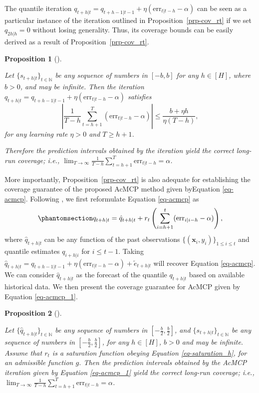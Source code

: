 \documentclass[
  11pt,
  12pt]{article}
\theoremstyle{plain}
\newtheorem{proposition}{Proposition}[section]
\theoremstyle{remark}
\begin{document}
The quantile iteration
\(q_{t+h|t}=q_{t+h-1|t-1}+\eta (\mathrm{err}_{t|t-h}-\alpha)\) can be
seen as a particular instance of the iteration outlined in
Proposition~\ref{prp-cov_rt} if we set \(q_{2h|h}=0\) without losing
generality. Thus, its coverage bounds can be easily derived as a result
of Proposition~\ref{prp-cov_rt}.

\begin{proposition}[]\protect\hypertarget{prp-cov_qt}{}\label{prp-cov_qt}

Let \(\{s_{t+h|t}\}_{t\in\mathbb{N}}\) be any sequence of numbers in
\([-b, b]\) for any \(h\in[H]\), where \(b>0\), and may be infinite.
Then the iteration
\(q_{t+h|t}=q_{t+h-1|t-1}+\eta (\mathrm{err}_{t|t-h}-\alpha)\) satisfies
\[
\left|\frac{1}{T-h}\sum_{t=h+1}^{T}(\mathrm{err}_{t|t-h}-\alpha)\right| \leq \frac{b + \eta h}{\eta(T-h)},
\] for any learning rate \(\eta > 0\) and \(T \geq h+1\).

Therefore the prediction intervals obtained by the iteration yield the
correct long-run coverage; i.e.,
\(\lim _{T \rightarrow \infty} \frac{1}{T-h} \sum_{t=h+1}^T \mathrm{err}_{t|t-h} = \alpha\).

\end{proposition}

More importantly, Proposition~\ref{prp-cov_rt} is also adequate for
establishing the coverage guarantee of the proposed AcMCP method given
byEquation \eqref{eq-acmcp}. Following \citet{angelopoulos2024}, we
first reformulate Equation \eqref{eq-acmcp} as
\begin{equation}\phantomsection\label{eq-acmcp_1}{
q_{t+h|t}=\hat{q}_{t+h|t}+r_t\left(\sum_{i=h+1}^t (\mathrm{err}_{i|i-h}-\alpha)\right),
}\end{equation} where \(\hat{q}_{t+h|t}\) can be any function of the
past observations \(\{(\bm{x}_i, y_i)\}_{1 \leq i \leq t}\) and quantile
estimates \(q_{i+h|i}\) for \(i \leq t-1\). Taking
\(\hat{q}_{t+h|t}=q_{t+h-1|t-1}+\eta (\mathrm{err}_{t|t-h}-\alpha)+\tilde{e}_{t+h|t}\)
will recover Equation \eqref{eq-acmcp}. We can consider
\(\hat{q}_{t+h|t}\) as the forecast of the quantile \(q_{t+h|t}\) based
on available historical data. We then present the coverage guarantee for
AcMCP given by Equation \eqref{eq-acmcp_1}.

\begin{proposition}[]\protect\hypertarget{prp-cov_acmcp}{}\label{prp-cov_acmcp}

Let \(\{\hat{q}_{t+h|t}\}_{t\in\mathbb{N}}\) be any sequence of numbers
in \([-\frac{b}{2}, \frac{b}{2}]\), and
\(\{s_{t+h|t}\}_{t\in\mathbb{N}}\) be any sequence of numbers in
\([-\frac{b}{2},\frac{b}{2}]\), for any \(h\in[H]\), \(b>0\) and may be
infinite. Assume that \(r_t\) is a saturation function obeying Equation
\eqref{eq-saturation_h}, for an admissible function \(g\). Then the
prediction intervals obtained by the AcMCP iteration given by Equation
\eqref{eq-acmcp_1} yield the correct long-run coverage; i.e.,
\(\lim _{T \rightarrow \infty} \frac{1}{T-h} \sum_{t=h+1}^T \mathrm{err}_{t|t-h} = \alpha\).

\end{proposition}
\end{document}
